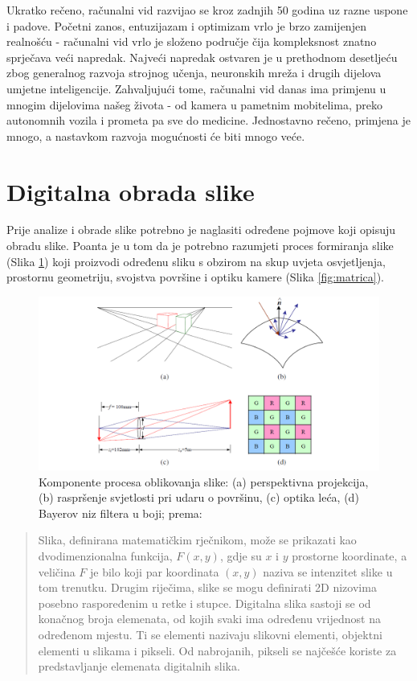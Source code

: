 \documentclass[]{foi} %
\begin{document}
Ukratko rečeno, računalni vid razvijao se kroz zadnjih 50 godina uz razne uspone i padove. Početni zanos, entuzijazam i optimizam vrlo je brzo zamijenjen realnošću - računalni vid vrlo je složeno područje čija kompleksnost znatno sprječava veći napredak. Najveći napredak ostvaren je u prethodnom desetljeću zbog generalnog razvoja strojnog učenja, neuronskih mreža i drugih dijelova umjetne inteligencije. Zahvaljujući tome, računalni vid danas ima primjenu u mnogim dijelovima našeg života - od kamera u pametnim mobitelima, preko autonomnih vozila i prometa pa sve do medicine. Jednostavno rečeno, primjena je mnogo, a nastavkom razvoja mogućnosti će biti mnogo veće.

\newpage
\section{Digitalna obrada slike}

Prije analize i obrade slike potrebno je naglasiti određene pojmove koji opisuju obradu slike. Poanta je u tom da je potrebno razumjeti proces formiranja slike (Slika \ref{fig:formacija}) koji proizvodi određenu sliku s obzirom na skup uvjeta osvjetljenja, prostornu geometriju, svojstva površine i optiku kamere (Slika \ref{fig:matrica}).

\begin{figure}[!ht]
    \centering
    \includegraphics[width=1\textwidth]{slike/formacija.png}
    \caption{Komponente procesa oblikovanja slike: (a) perspektivna projekcija, (b) raspršenje svjetlosti pri udaru o površinu, (c) optika leća, (d) Bayerov niz filtera u boji; prema: \cite{szeliskicvaa}}
    \label{fig:formacija}
\end{figure}

\blockquote[{\cite{digital}}]{Slika, definirana matematičkim rječnikom, može se prikazati kao dvodimenzionalna funkcija, $F(x,y)$, gdje su $x$ i $y$ prostorne koordinate, a veličina $F$ je bilo koji par koordinata $(x,y)$ naziva se intenzitet slike u tom trenutku.
Drugim riječima, slike se mogu definirati 2D nizovima posebno raspoređenim u retke i stupce.
Digitalna slika sastoji se od konačnog broja elemenata, od kojih svaki ima određenu vrijednost na određenom mjestu. Ti se elementi nazivaju slikovni elementi, objektni elementi u slikama i pikseli. Od nabrojanih, pikseli se najčešće koriste za predstavljanje elemenata digitalnih slika.}
\end{document}
